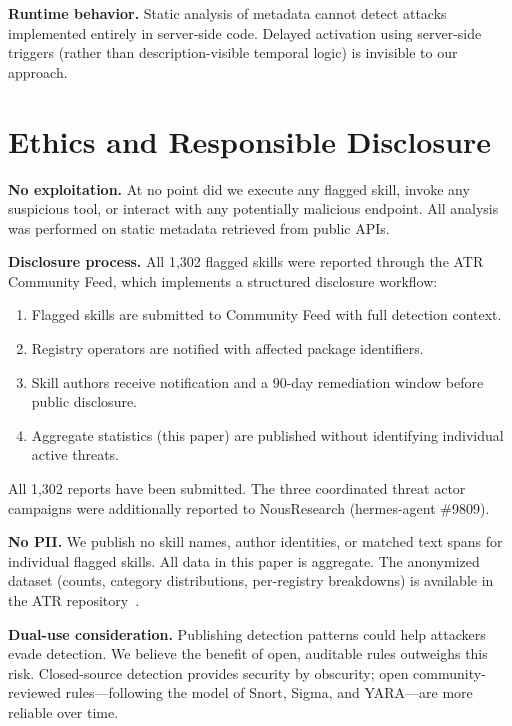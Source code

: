 \documentclass[letterpaper,twocolumn,10pt]{article}
\begin{document}
\textbf{Runtime behavior.}  Static analysis of metadata cannot detect
attacks implemented entirely in server-side code.  Delayed activation
using server-side triggers (rather than description-visible temporal
logic) is invisible to our approach.

\section{Ethics and Responsible Disclosure}
\label{sec:ethics}

\textbf{No exploitation.}  At no point did we execute any flagged skill,
invoke any suspicious tool, or interact with any potentially malicious
endpoint.  All analysis was performed on static metadata retrieved from
public APIs.

\textbf{Disclosure process.}  All 1,302 flagged skills were reported
through the ATR Community Feed, which implements a structured disclosure
workflow:

\begin{enumerate}[leftmargin=*,nosep]
  \item Flagged skills are submitted to Community Feed with full detection
    context.
  \item Registry operators are notified with affected package
    identifiers.
  \item Skill authors receive notification and a 90-day remediation
    window before public disclosure.
  \item Aggregate statistics (this paper) are published without
    identifying individual active threats.
\end{enumerate}

All 1,302 reports have been submitted.  The three coordinated threat
actor campaigns were additionally reported to NousResearch
(hermes-agent \#9809).

\textbf{No PII.}  We publish no skill names, author identities, or
matched text spans for individual flagged skills.  All data in this paper
is aggregate.  The anonymized dataset (counts, category distributions,
per-registry breakdowns) is available in the ATR repository~\cite{atr}.

\textbf{Dual-use consideration.}  Publishing detection patterns could
help attackers evade detection.  We believe the benefit of open,
auditable rules outweighs this risk.  Closed-source detection provides
security by obscurity; open community-reviewed rules---following the
model of Snort, Sigma, and YARA---are more reliable over time.
\end{document}
